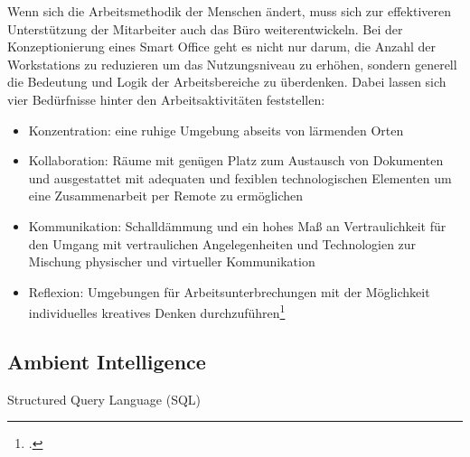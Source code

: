 Wenn sich die Arbeitsmethodik der Menschen ändert, muss sich zur effektiveren Unterstützung der Mitarbeiter auch das Büro weiterentwickeln. Bei der Konzeptionierung eines Smart Office geht es nicht nur darum, die Anzahl der Workstations zu reduzieren um das Nutzungsniveau zu erhöhen, sondern generell die Bedeutung und Logik der Arbeitsbereiche zu überdenken. Dabei lassen sich vier Bedürfnisse hinter den Arbeitsaktivitäten feststellen:

\begin{itemize}
\item Konzentration: eine ruhige Umgebung abseits von lärmenden Orten
\item Kollaboration: Räume mit genügen Platz zum Austausch von Dokumenten und ausgestattet mit adequaten und fexiblen technologischen Elementen um eine  Zusammenarbeit per Remote zu ermöglichen
\item Kommunikation: Schalldämmung und ein hohes Maß an Vertraulichkeit für den Umgang mit vertraulichen Angelegenheiten und Technologien zur Mischung physischer und virtueller Kommunikation
\item Reflexion: Umgebungen für Arbeitsunterbrechungen mit der Möglichkeit individuelles kreatives Denken durchzuführen\footcite[Vgl.][]{efm}
\end{itemize}

\subsection{Ambient Intelligence}
Structured Query Language (SQL) 